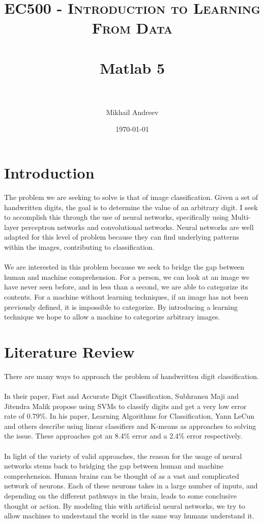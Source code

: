 \documentclass[paper=a4, fontsize=11pt]{scrartcl} %
\title{	
	\normalfont \normalsize 
	\textsc{EC500 - Introduction to Learning From Data} \\ [25pt] %
	\horrule{0.5pt} \\[0.4cm] %
	\huge Matlab 5 \\ %
	\horrule{2pt} \\[0.5cm] %
}
\author{Mikhail Andreev} %
\date{\normalsize\today} %
\numberwithin{equation}{section} %
\numberwithin{figure}{section} %
\numberwithin{table}{section} %
\begin{document}
	
	\maketitle %
	

	
	\newpage
	\section{Introduction}
	The problem we are seeking to solve is that of image classification. Given a set of handwritten digits, the goal is to determine the value of an arbitrary digit. I seek to accomplish this through the use of neural networks, specifically using Multi-layer perceptron networks and convolutional networks. Neural networks are well adapted for this level of problem because they can find underlying patterns within the images, contributing to classification. 
	\\\\
	We are interested in this problem because we seek to bridge the gap between human and machine comprehension. For a person, we can look at an image we have never seen before, and in less than a second, we are able to categorize its contents. For a machine without learning techniques, if an image has not been previously defined, it is impossible to categorize. By introducing a learning technique we hope to allow a machine to categorize arbitrary images.
	\newpage
	\section{Literature Review}
	There are many ways to approach the problem of handwritten digit classification.
	\\\\
	In their paper, Fast and Accurate Digit Classification, Subhransu Maji and Jitendra Malik propose using SVMs to classify digits and get a very low error rate of 0.79\%. In his paper, Learning Algorithms for Classification, Yann LeCun and others describe using linear classifiers and K-means as approaches to solving the issue. These approaches got an 8.4\% error and a 2.4\% error respectively.
	\\\\
	In light of the variety of valid approaches, the reason for the usage of neural networks stems back to bridging the gap between human and machine comprehension. Human brains can be thought of as a vast and complicated network of neurons. Each of these neurons takes in a large number of inputs, and depending on the different pathways in the brain, leads to some conclusive thought or action. By modeling this with artificial neural networks, we try to allow machines to understand the world in the same way humans understand it.
	\newpage
\end{document}
